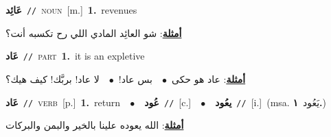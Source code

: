 \documentclass[10pt,a4paper,twoside]{article} %
\begin{document}
\begin{multicols}{2}
{\setlength\topsep{0pt}\textbf{\foreignlanguage{arabic}{عَائِد}}\ {\color{gray}\texttt{//}\color{black}}\ \textsc{noun}\ [m.]\ \textbf{1.}~revenues\  \begin{flushright}\color{gray}\foreignlanguage{arabic}{\textbf{\underline{\foreignlanguage{arabic}{أمثلة}}}: شو العائِد المادي اللي رح تكسبه أنت؟}\end{flushright}\color{black}} \vspace{2mm}

{\setlength\topsep{0pt}\textbf{\foreignlanguage{arabic}{عَاد}}\ {\color{gray}\texttt{//}\color{black}}\ \textsc{part}\ \textbf{1.}~it is an expletive\  \begin{flushright}\color{gray}\foreignlanguage{arabic}{\textbf{\underline{\foreignlanguage{arabic}{أمثلة}}}: عاد هو حكى\ $\bullet$\ \  بس عاد!\ $\bullet$\ \  لا عاد! بربَّك! كيف هيك؟}\end{flushright}\color{black}} \vspace{2mm}

{\setlength\topsep{0pt}\textbf{\foreignlanguage{arabic}{عَاد}}\ {\color{gray}\texttt{//}\color{black}}\ \textsc{verb}\ [p.]\ \textbf{1.}~return\ \ $\bullet$\ \ \setlength\topsep{0pt}\textbf{\foreignlanguage{arabic}{عُود}}\ {\color{gray}\texttt{//}\color{black}}\ [c.]\ \ $\bullet$\ \ \setlength\topsep{0pt}\textbf{\foreignlanguage{arabic}{يعُود}}\ {\color{gray}\texttt{//}\color{black}}\ [i.]\ \color{gray}(msa. \foreignlanguage{arabic}{يَعُود}~\foreignlanguage{arabic}{\textbf{١.}})\color{black}\  \begin{flushright}\color{gray}\foreignlanguage{arabic}{\textbf{\underline{\foreignlanguage{arabic}{أمثلة}}}: الله يعوده علينا بالخير والبمن والبركات}\end{flushright}\color{black}} \vspace{2mm}


\end{multicols}
\end{document}
